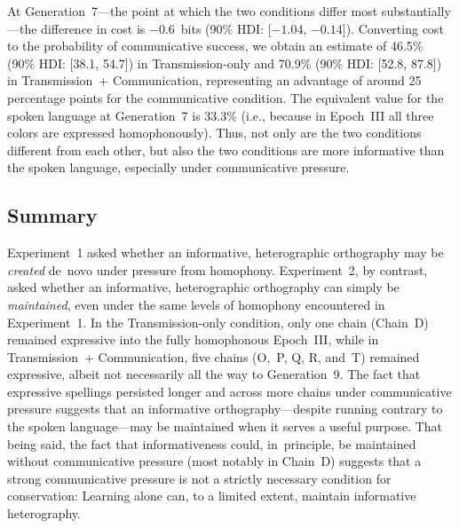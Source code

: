 \documentclass[doc,biblatex]{apa7}
\begin{document}
At Generation~7---the point at which the two conditions differ most substantially---the difference in cost is $-0.6$~bits (90\% HDI: [$-1.04$, $-0.14$]). Converting cost to the probability of communicative success, we obtain an estimate of 46.5\% (90\% HDI: [38.1, 54.7]) in Transmission-only and 70.9\% (90\% HDI: [52.8, 87.8]) in Transmission~+ Communication, representing an advantage of around 25 percentage points for the communicative condition. The equivalent value for the spoken language at Generation~7 is 33.3\% (i.e., because in Epoch~III all three colors are expressed homophonously). Thus, not only are the two conditions different from each other, but also the two conditions are more informative than the spoken language, especially under communicative pressure.

\subsection{Summary}

Experiment~1 asked whether an informative, heterographic orthography may be \textit{created} de~novo under pressure from homophony. Experiment~2, by contrast, asked whether an informative, heterographic orthography can simply be \textit{maintained}, even under the same levels of homophony encountered in Experiment~1. In the Transmission-only condition, only one chain (Chain~D) remained expressive into the fully homophonous Epoch~III, while in Transmission~+ Communication, five chains (O,~P, Q, R, and~T) remained expressive, albeit not necessarily all the way to Generation~9. The fact that expressive spellings persisted longer and across more chains under communicative pressure suggests that an informative orthography---despite running contrary to the spoken language---may be maintained when it serves a useful purpose. That being said, the fact that informativeness could, in~principle, be maintained without communicative pressure (most notably in Chain~D) suggests that a strong communicative pressure is not a strictly necessary condition for conservation: Learning alone can, to a limited extent, maintain informative heterography.
\end{document}
